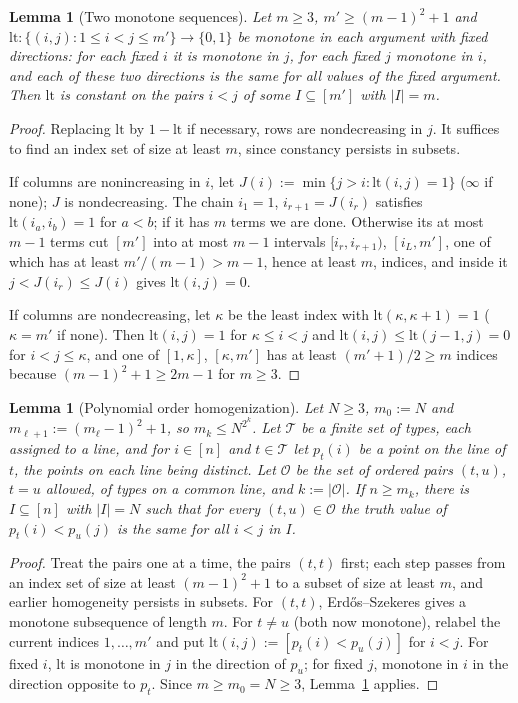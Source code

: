 \documentclass[11pt]{article}
\numberwithin{equation}{section}
\theoremstyle{plain}
\newtheorem{lemma}[theorem]{Lemma}
\theoremstyle{definition}
\theoremstyle{remark}
\begin{document}
\begin{lemma}[Two monotone sequences]
\label{lem:two-sequence}
Let $m\ge3$, $m'\ge(m-1)^2+1$ and $\mathrm{lt}:\{(i,j):1\le i<j\le m'\}\to\{0,1\}$
be monotone in each argument with fixed directions: for each fixed $i$ it is
monotone in $j$, for each fixed $j$ monotone in $i$, and each of these two
directions is the same for all values of the fixed argument.  Then $\mathrm{lt}$ is
constant on the pairs $i<j$ of some $I\subseteq[m']$ with $|I|=m$.
\end{lemma}

\begin{proof}
Replacing $\mathrm{lt}$ by $1-\mathrm{lt}$ if necessary, rows are nondecreasing in $j$.
It suffices to find an index set of size at least $m$, since constancy persists in
subsets.

If columns are nonincreasing in $i$, let $J(i):=\min\{j>i:\mathrm{lt}(i,j)=1\}$ ($\infty$ if
none); $J$ is nondecreasing.  The chain $i_1=1$, $i_{r+1}=J(i_r)$ satisfies
$\mathrm{lt}(i_a,i_b)=1$ for $a<b$; if it has $m$ terms we are done.  Otherwise its at most
$m-1$ terms cut $[m']$ into at most $m-1$ intervals $[i_r,i_{r+1})$, $[i_L,m']$, one
of which has at least $m'/(m-1)>m-1$, hence at least $m$, indices, and inside it $j<J(i_r)\le J(i)$ gives
$\mathrm{lt}(i,j)=0$.

If columns are nondecreasing, let $\kappa$ be the least index with
$\mathrm{lt}(\kappa,\kappa+1)=1$ ($\kappa=m'$ if none).  Then $\mathrm{lt}(i,j)=1$ for $\kappa\le i<j$
and $\mathrm{lt}(i,j)\le \mathrm{lt}(j-1,j)=0$ for $i<j\le\kappa$, and one of $[1,\kappa]$,
$[\kappa,m']$ has at least $(m'+1)/2\ge m$ indices because $(m-1)^2+1\ge2m-1$ for
$m\ge3$.
\end{proof}

\begin{lemma}[Polynomial order homogenization]
\label{lem:order-homogenize}
Let $N\ge3$, $m_0:=N$ and $m_{\ell+1}:=(m_\ell-1)^2+1$, so $m_k\le N^{2^k}$.  Let $\mathcal T$ be a
finite set of types, each assigned to a line, and for $i\in[n]$ and $t\in \mathcal T$ let
$p_t(i)$ be a point on the line of $t$, the points on each line being distinct.  Let
$\mathcal O$ be the set of ordered pairs $(t,u)$, $t=u$ allowed, of types on a common line,
and $k:=|\mathcal O|$.  If $n\ge m_k$, there is $I\subseteq[n]$ with $|I|=N$ such that for
every $(t,u)\in\mathcal O$ the truth value of $p_t(i)<p_u(j)$ is the same for all $i<j$ in
$I$.
\end{lemma}

\begin{proof}
Treat the pairs one at a time, the pairs $(t,t)$ first; each step passes from an
index set of size at least $(m-1)^2+1$ to a subset of size at least $m$, and earlier
homogeneity persists in subsets.  For $(t,t)$, Erd\H{o}s--Szekeres gives a monotone
subsequence of length $m$.  For $t\ne u$ (both now monotone), relabel the current
indices $1,\ldots,m'$ and put $\mathrm{lt}(i,j):=[p_t(i)<p_u(j)]$ for $i<j$.  For fixed $i$,
$\mathrm{lt}$ is monotone in $j$ in the direction of $p_u$; for fixed $j$, monotone in $i$ in
the direction opposite to $p_t$.  Since $m\ge m_0=N\ge3$,
Lemma~\ref{lem:two-sequence} applies.
\end{proof}
\end{document}
